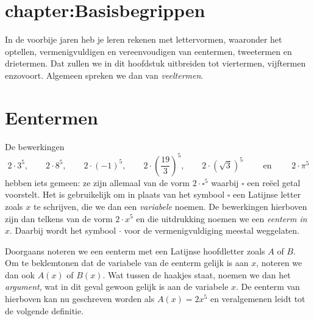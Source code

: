 \documentclass{ximera}
\begin{document}

\renewcommand{\contentsname}{\huge{Inhoud}} 


\setcounter{totaalaantalvoorbladen}{\value{page}}



\section{chapter:Basisbegrippen}

In de voorbije jaren heb je leren rekenen met lettervormen, waaronder het optellen, ver\-menigvuldigen en vereenvoudigen van eentermen, tweetermen en drietermen. Dat zullen we in dit hoofdstuk uitbreiden tot viertermen, vijftermen enzovoort. Algemeen spreken we dan van {\em veeltermen}.

\section{Eentermen}

De bewerkingen
\[
2\cdot 3^5, \qquad 2\cdot 8^5, \qquad 2\cdot (-1)^5, \qquad 2\cdot\left(\frac{19}{3}\right)^5, \qquad 2\cdot\left(\sqrt{3}\right)^5 \qquad \text{ en } \qquad 2 \cdot \pi^5
\]
hebben iets gemeen: ze zijn allemaal van de vorm $2\cdot \square^5$ waarbij $\square$ een re\"eel getal voorstelt. Het is gebruikelijk om in plaats van het symbool $\square$ een Latijnse letter zoals $x$ te schrijven, die we dan een {\em variabele} noemen. De bewerkingen hierboven zijn dan telkens van de vorm $2 \cdot x^5$ en die uitdrukking noemen we een {\em eenterm in $x$}. Daarbij wordt het symbool $\cdot$ voor de vermenigvuldiging meestal weggelaten. 

Doorgaans noteren we een eenterm met een Latijnse hoofdletter zoals $A$ of $B$. Om te beklemtonen dat de variabele van de eenterm gelijk is aan $x$, noteren we dan ook $A(x)$ of $B(x)$. Wat tussen de haakjes staat, noemen we dan het {\em argument}, wat in dit geval gewoon gelijk is aan de variabele $x$. De eenterm van hierboven kan nu geschreven worden als $A(x) = 2x^5$ en veralgemenen leidt tot de volgende definitie.
\end{document}

